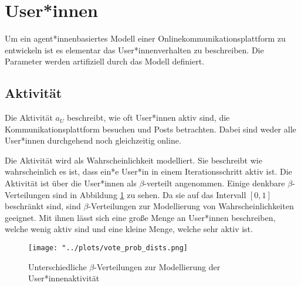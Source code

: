 

\section{User*innen}


Um ein agent*innenbasiertes Modell einer Onlinekommunikationsplattform zu entwickeln ist es elementar das User*innenverhalten zu beschreiben. Die Parameter werden artifiziell durch das Modell definiert.

\subsection{Aktivität}


Die Aktivität $a_U$ beschreibt, wie oft User*innen aktiv sind, die Kommunikationsplattform besuchen und Posts betrachten. Dabei sind weder alle User*innen durchgehend noch gleichzeitig online.  

Die Aktivität wird als Wahrscheinlichkeit modelliert. Sie beschreibt wie wahrscheinlich es ist, dass ein*e User*in in einem Iterationsschritt aktiv ist. Die Aktivität ist über die User*innen als $\beta$-verteilt angenommen. Einige denkbare $\beta$-Verteilungen sind in Abbildung \ref{fig:betas} zu sehen. Da sie auf das Intervall $[0,1]$ beschränkt sind, sind $\beta$-Verteilungen zur Modellierung von Wahrscheinlichkeiten geeignet. Mit ihnen lässt sich eine große Menge an User*innen beschreiben, welche wenig aktiv sind und eine kleine Menge, welche sehr aktiv ist.

\begin{figure}[!h]
	\texttt{[image: "../plots/vote\_prob\_dists.png]}
	\caption{Unterschiedliche $\beta$-Verteilungen zur Modellierung der User*innenaktivität}
	\label{fig:betas}
\end{figure}


